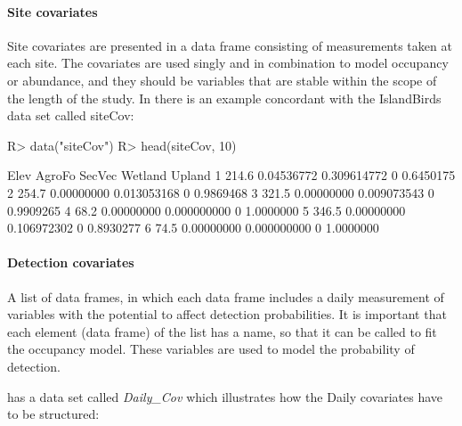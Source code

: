 \documentclass[article]{jss}
\begin{document}
\paragraph{Site covariates}\label{site-covariates}

Site covariates are presented in a data frame consisting of measurements
taken at each site. The covariates are used singly and in combination to
model occupancy or abundance, and they should be variables that are
stable within the scope of the length of the study. In
 there is an example concordant with the
IslandBirds data set called siteCov:

\begin{CodeChunk}

\begin{CodeInput}
R> data("siteCov")
R> head(siteCov, 10)
\end{CodeInput}
\end{CodeChunk}

\begin{CodeChunk}

\begin{CodeOutput}
   Elev     AgroFo      SecVec Wetland    Upland
1 214.6 0.04536772 0.309614772       0 0.6450175
2 254.7 0.00000000 0.013053168       0 0.9869468
3 321.5 0.00000000 0.009073543       0 0.9909265
4  68.2 0.00000000 0.000000000       0 1.0000000
5 346.5 0.00000000 0.106972302       0 0.8930277
6  74.5 0.00000000 0.000000000       0 1.0000000
\end{CodeOutput}
\end{CodeChunk}

\paragraph{Detection covariates}\label{detection-covariates}

A list of data frames, in which each data frame includes a daily
measurement of variables with the potential to affect detection
probabilities. It is important that each element (data frame) of the
list has a name, so that it can be called to fit the occupancy model.
These variables are used to model the probability of detection.

 has a data set called \emph{Daily\_Cov} which
illustrates how the Daily covariates have to be structured:
\end{document}
